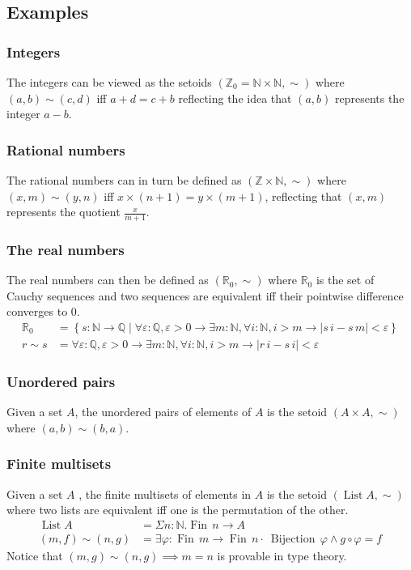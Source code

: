 \documentclass[envcountsame]{llncs}
\newcommand{\N}{\mathbb{N}}
\newcommand{\Q}{\mathbb{Q}}
\newcommand{\R}{\mathbb{R}}
\newcommand{\Z}{\mathbb{Z}}
\providecommand{\set}  [1]{\left\{#1\right\}}
\DeclareMathOperator{\List}{List}
\DeclareMathOperator{\Fin}{Fin}
\DeclareMathOperator{\Bijection}{Bijection}
\begin{document}
\subsection{Examples}\label{sec:setoids:examples}
\subsubsection*{Integers}
The integers can be viewed as the setoids $(\Z_0=\N\times\N,\sim)$ where $(a,b)\sim(c,d)$ if{f} $a+d=c+b$ reflecting the idea that $(a,b)$ represents the integer $a-b$.
\subsubsection*{Rational numbers}
The rational numbers can in turn be defined as $(\Z\times\N,\sim)$ where $(x,m)\sim(y,n)$ if{f} $x\times(n+1)=y\times(m+1)$, reflecting that $(x,m)$ represents the quotient $\frac {x}{m+1}$.


\subsubsection*{The real numbers}

The real numbers can then be defined as $(\R_0,\sim)$ where $\R_0$ is the set of Cauchy sequences and two sequences are equivalent if{f} their pointwise difference converges to $0$.
\begin{align*}
\R_0&=\set{s : \N\to\Q \mid \forall\varepsilon :\Q,\varepsilon>0\to\exists m:\N, \forall i:\N, i>m\to |s\,i - s\, m|<\varepsilon}\\
r\sim s &= \forall\varepsilon :\Q,\varepsilon>0\to\exists m:\N, \forall i:\N, i>m\to |r\,i - s\,i|<\varepsilon
\end{align*}

\subsubsection*{Unordered pairs}
Given a set $A$, the unordered pairs of elements of $A$ is the setoid $(A\times A,\sim)$ where
$(a,b)\sim(b,a)$.

\subsubsection*{Finite multisets}
Given a set $A$ , the finite multisets of elements in $A$ is the setoid $(\List A,\sim)$ where two lists are equivalent if{f} one is the permutation of the other.
\begin{align*}
\List A &= \Sigma n:\N.\Fin\,n\to A\\
(m,f)\sim(n,g) &= \exists \varphi : \Fin\,m \to \Fin\,n \cdot\ \Bijection\,\varphi \land g\circ\varphi = f
\end{align*}
Notice that $(m,g)\sim(n,g)\implies m=n$ is provable in type theory.
\end{document}
